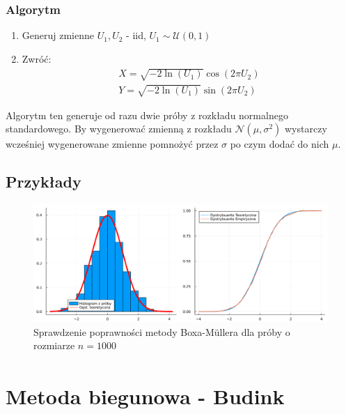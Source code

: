 \documentclass[12pt]{mwrep}
\begin{document}
	\subsubsection{Algorytm}
	\begin{enumerate}[leftmargin=10mm]
		\item Generuj zmienne $U_1, U_2$ - iid, $U_1\sim\mathcal{U}(0,1)$
		\item Zwróć:
		\begin{equation}
			\begin{split}
				X=\sqrt{-2\ln(U_1)}\cos\left(2\pi U_2\right)\\
				Y=\sqrt{-2\ln(U_1)}\sin\left(2\pi U_2\right)
			\end{split}
		\end{equation}
	\end{enumerate}
	Algorytm ten generuje od razu dwie próby z rozkładu normalnego standardowego. By wygenerować zmienną z rozkładu $\mathcal{N}(\mu,\sigma^2)$ wystarczy wcześniej wygenerowane zmienne pomnożyć przez $\sigma$ po czym dodać do nich $\mu$.
	\subsection{Przykłady}
	
	\begin{figure}[H]\caption{Sprawdzenie poprawności metody Boxa-M\"ullera dla próby o rozmiarze $n=1000$}\label{fig:BM}
		\includegraphics[width=\columnwidth]{fig/fig_BM.png}
	\end{figure}
	
	
	
	\section{Metoda biegunowa\textsuperscript{\cite{polar}} - Budink}
\end{document}
